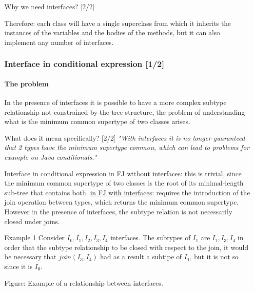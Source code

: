 \documentclass{beamer}
\begin{document}
\begin{frame}{Why we need interfaces? [2/2]}
   
    Therefore: each class will have a single superclass from which it inherits the instances of the variables and the bodies of the methods, but it can also implement any number of interfaces.
\end{frame}
\begin{frame}
\frametitle{Interface in conditional expression [1/2]}
\framesubtitle{The problem}
In the presence of interfaces it is possible to have a more complex subtype relationship not constrained by the tree structure, the problem of understanding what is the minimum common supertype of two classes arises.\newline
\end{frame}

\begin{frame}{What does it mean specifically? [2/2]}
    \textit{"With interfaces it is no longer guaranteed that 2 types have the minimum supertype common, which can lead to problems for example on Java conditionals."}
\end{frame}
\begin{frame}{Interface in conditional expression}
    \underline{in FJ without interfaces}: this is trivial, since the minimum common supertype of two classes is the root of its minimal-length sub-tree that contains both.\newline\newline
    \underline{in FJ with interfaces}: requires the introduction of the join operation between types, which returns the minimum common supertype.\newline\newline
However in the presence of interfaces, the subtype relation is not necessarily
closed under joins. 
\end{frame}


\begin{frame}{Example 1}
Consider $I_0,I_1,I_2,I_3,I_4$ interfaces.\newline
The subtypes of $I_1$ are $I_1, I_3, I_4$ in order that the subtype relationship to be closed with respect to the join, it would be necessary that $join(I_3,I_4)$ had as a result a subtipe of $I_1$, but it is not so since it is $I_0$.
\begin{center}
\end{center}
Figure: Example of a relationship between interfaces.
\end{frame}
\end{document}

